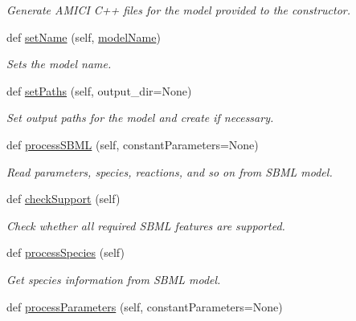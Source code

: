 \begin{DoxyCompactItemize}
\begin{DoxyCompactList}\small\item\em Generate A\+M\+I\+CI C++ files for the model provided to the constructor. \end{DoxyCompactList}\item 
def \mbox{\hyperlink{classamici_1_1sbml__import_1_1_sbml_importer_af9ec4a20beb62b41663733ecfc8e1713}{set\+Name}} (self, \mbox{\hyperlink{classamici_1_1sbml__import_1_1_sbml_importer_adefaf64a0bbe772b9463fa2a9cba904e}{model\+Name}})
\begin{DoxyCompactList}\small\item\em Sets the model name. \end{DoxyCompactList}\item 
def \mbox{\hyperlink{classamici_1_1sbml__import_1_1_sbml_importer_aa444f1d8b15c02fc5e2252cad86ae0ab}{set\+Paths}} (self, output\+\_\+dir=None)
\begin{DoxyCompactList}\small\item\em Set output paths for the model and create if necessary. \end{DoxyCompactList}\item 
def \mbox{\hyperlink{classamici_1_1sbml__import_1_1_sbml_importer_ac188693ab1d9fc500d55748dbde9bf89}{process\+S\+B\+ML}} (self, constant\+Parameters=None)
\begin{DoxyCompactList}\small\item\em Read parameters, species, reactions, and so on from S\+B\+ML model. \end{DoxyCompactList}\item 
def \mbox{\hyperlink{classamici_1_1sbml__import_1_1_sbml_importer_ae9585f937c02f0618abeb06dd48bcd54}{check\+Support}} (self)
\begin{DoxyCompactList}\small\item\em Check whether all required S\+B\+ML features are supported. \end{DoxyCompactList}\item 
def \mbox{\hyperlink{classamici_1_1sbml__import_1_1_sbml_importer_a4912a89bf86ec8e0c1d9758b8090e327}{process\+Species}} (self)
\begin{DoxyCompactList}\small\item\em Get species information from S\+B\+ML model. \end{DoxyCompactList}\item 
def \mbox{\hyperlink{classamici_1_1sbml__import_1_1_sbml_importer_a26d072114efe1fec695cc4030c64e1ea}{process\+Parameters}} (self, constant\+Parameters=None)

\end{DoxyCompactItemize}
